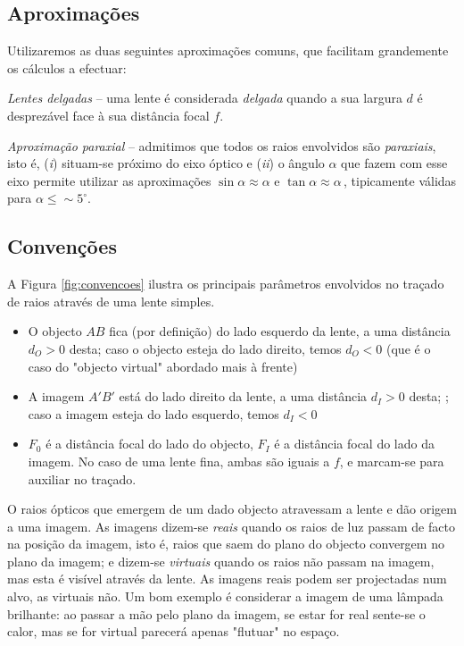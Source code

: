 \documentclass[a4paper,12pt]{article}      %
\begin{document}
\subsection{\sf Aproximações}
Utilizaremos as duas seguintes aproximações comuns, que facilitam grandemente os cálculos a efectuar:

\emph{Lentes delgadas} -- uma lente é considerada \emph{delgada} quando a sua largura $d$ é desprezável face à sua distância focal $f$.

\emph{Aproximação paraxial} -- admitimos que todos os raios envolvidos são \emph{paraxiais}, isto é, (\emph{i}) situam-se próximo do eixo óptico e (\emph{ii}) o ângulo $\alpha$ que fazem com esse eixo permite utilizar as aproximações $\sin \alpha \approx \alpha$ e  $\tan \alpha \approx \alpha\,$, tipicamente válidas para $\alpha \leq \sim5^{\circ}$.


\subsection{\sf Convenções}
A Figura \ref{fig:convencoes} ilustra os principais parâmetros envolvidos no traçado de raios através de uma lente simples.

\begin{itemize}
\item O objecto $AB$ fica (por definição) do lado esquerdo da lente, a uma distância $d_O>0$ desta; caso o objecto esteja do lado direito, temos $d_O<0$ (que é o caso do "objecto virtual" abordado mais à frente)
\item A imagem $A'B'$ está do lado direito da lente, a uma distância $d_I>0$ desta; ; caso a imagem esteja do lado esquerdo, temos $d_I<0$
\item $F_0$ é a distância focal do lado do objecto, $F_I$ é a distância focal do lado da imagem. No caso de uma lente fina, ambas são iguais a $f$, e marcam-se para auxiliar no traçado.
\end{itemize}


O raios ópticos que emergem de um dado objecto atravessam a lente e dão origem a uma imagem. As imagens dizem-se \emph{reais} quando os raios de luz passam de facto na posição da imagem, isto é, raios que saem do plano do objecto convergem no plano da imagem; e dizem-se \emph{virtuais} quando os raios não passam na imagem, mas esta é visível através da lente. As imagens reais podem ser projectadas num alvo, as virtuais não. Um bom exemplo é considerar a imagem de uma lâmpada brilhante: ao passar a mão pelo plano da imagem, se estar for real sente-se o calor, mas se for virtual parecerá apenas "flutuar" no espaço.
\end{document}
